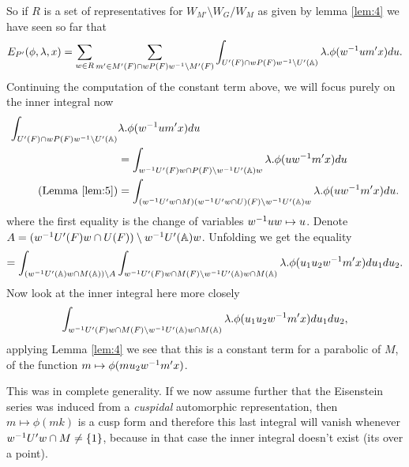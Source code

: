    So if \(R\) is a set of representatives for \(W_{M'}\setminus W_G / W_{M}\) as given by lemma \ref{lem:4} we have seen so far that 
    \[ E_{P'}( \phi, \lambda, x) =\sum_{ w\in R} \sum_{m'\in M'(F)\cap wP(F)w\inv\setminus M'(F)} \int_{U'(F)\cap wP(F)w\inv \setminus U'(\A)} \lambda.\phi( w\inv um' x)  du. \]
    Continuing the computation of the constant term above, we will focus purely on the inner integral now
    \begin{equation*}
        \begin{aligned}
            \int_{U'(F)\cap wP(F)w\inv \setminus U'(\A)}& \lambda.\phi( w\inv um' x)  du \\&= \int_{w\inv U'(F)w \cap P(F) \setminus w\inv U'(\A)w} \lambda.\phi( uw\inv m' x)  du \\
            (\text{Lemma \ref{lem:5}})&= \int_{(w\inv U' w \cap M)(w\inv U' w \cap U)(F) \setminus w\inv U'(\A)w} \lambda.\phi( uw\inv m' x)  du . \\
        \end{aligned}
    \end{equation*}
    where the first equality is the change of variables \(w^{-1} u w\mapsto u \). Denote \(A = (w\inv U'(F) w \cap U(F) ) \setminus w\inv U'(\A)w \). Unfolding we get the equality
    \[= \int_{(w\inv U'(\A)w \cap M(\A)) \setminus A} \int_{w\inv U'(F) w \cap M(F) \setminus w\inv U'(\A)w \cap M(\A)} \lambda.\phi( u_1 u_2 w\inv m' x)  du_1 du_2.\]
     Now look at the inner integral here more closely 
    \[ \int_{w\inv U'(F) w \cap M(F) \setminus w\inv U'(\A)w \cap M(\A)}\lambda. \phi( u_1 u_2 w\inv m' x)  du_1 du_2,\]
    applying Lemma \ref{lem:4} we see that this is a constant term for a parabolic of \(M\), of the function \(m\mapsto \phi(m u_2 w\inv m' x)\). 
\begin{comment}
	    \begin{Lemma}
        \(u_2 w\inv m' x \in K\) with variables as above.
    \end{Lemma}
\end{comment}
    This was in complete generality. If we now assume further that the Eisenstein series was induced from a \textit{cuspidal} automorphic representation, then \(m\mapsto \phi(mk)\) is a cusp form and therefore this last integral will vanish whenever \(w^{-1} U'w \cap M \neq \{1\}\), because in that case the inner integral doesn't exist (its over a point).

